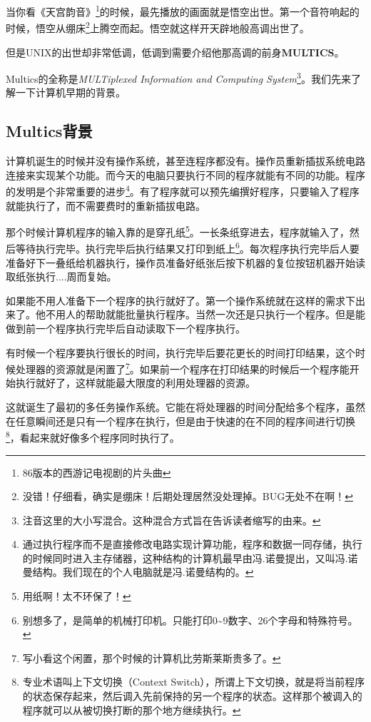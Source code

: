 \documentclass[amstex]{ctexbook}
\newenvironment{insertnote}{ \ttfamily\CJKfamily{KaiTi} }{\vskip 1cm }
\begin{document}
当你看《天宫韵音》\footnote{86版本的西游记电视剧的片头曲}的时候，最先播放的画面就是悟空出世。第一个音符响起的时候，悟空从绷床\footnote{没错！仔细看，确实是绷床！后期处理居然没处理掉。BUG无处不在啊！}上腾空而起。悟空就这样开天辟地般高调出世了。

但是UNIX的出世却非常低调，低调到需要介绍他那高调的前身\textbf{MULTICS}。

Multics的全称是\textit{MULTiplexed Information and Computing System}\footnote{注音这里的大小写混合。这种混合方式旨在告诉读者缩写的由来。}。我们先来了解一下计算机早期的背景。



\begin{insertnote}
\subsection*{Multics背景}

计算机诞生的时候并没有操作系统，甚至连程序都没有。操作员重新插拔系统电路连接来实现某个功能。而今天的电脑只要执行不同的程序就能有不同的功能。程序的发明是个非常重要的进步\footnote{通过执行程序而不是直接修改电路实现计算功能，程序和数据一同存储，执行的时候同时进入主存储器，这种结构的计算机最早由冯.诺曼提出，又叫冯.诺曼结构。我们现在的个人电脑就是冯.诺曼结构的。}。有了程序就可以预先编撰好程序，只要输入了程序就能执行了，而不需要费时的重新插拔电路。

那个时候计算机程序的输入靠的是穿孔纸\footnote{用纸啊！太不环保了！}。一长条纸穿进去，程序就输入了，然后等待执行完毕。执行完毕后执行结果又打印到纸上\footnote{别想多了，是简单的机械打印机。只能打印0\textasciitilde{}9数字、26个字母和特殊符号。}。每次程序执行完毕后人要准备好下一叠纸给机器执行，操作员准备好纸张后按下机器的复位按钮机器开始读取纸张执行....周而复始。

如果能不用人准备下一个程序的执行就好了。第一个操作系统就在这样的需求下出来了。他不用人的帮助就能批量执行程序。当然一次还是只执行一个程序。但是能做到前一个程序执行完毕后自动读取下一个程序执行。

有时候一个程序要执行很长的时间，执行完毕后要花更长的时间打印结果，这个时候处理器的资源就是闲置了\footnote{写小看这个闲置，那个时候的计算机比劳斯莱斯贵多了。}。如果前一个程序在打印结果的时候后一个程序能开始执行就好了，这样就能最大限度的利用处理器的资源。


这就诞生了最初的多任务操作系统。它能在将处理器的时间分配给多个程序，虽然在任意瞬间还是只有一个程序在执行，但是由于快速的在不同的程序间进行切换\footnote{专业术语叫上下文切换（Context Switch），所谓上下文切换，就是将当前程序的状态保存起来，然后调入先前保持的另一个程序的状态。这样那个被调入的程序就可以从被切换打断的那个地方继续执行。}，看起来就好像多个程序同时执行了。



\end{insertnote}
\end{document}
